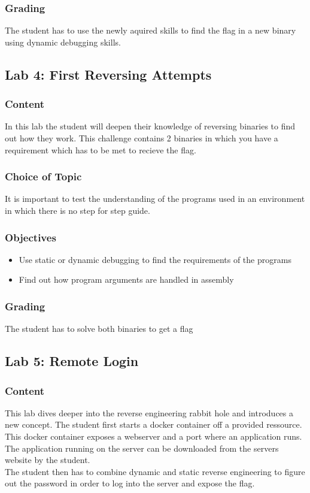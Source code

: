 \subsubsection*{Grading}
The student has to use the newly aquired skills to find the flag in a new binary using dynamic debugging skills.


\subsection{Lab 4: First Reversing Attempts}
\subsubsection*{Content}
In this lab the student will deepen their knowledge of reversing binaries to find out how they work. This challenge contains 2 binaries in which you have a requirement which has to be met to recieve the flag.
\subsubsection*{Choice of Topic}
It is important to test the understanding of the programs used in an environment in which there is no step for step guide.
\subsubsection*{Objectives}
\begin{itemize}
    \item Use static or dynamic debugging to find the requirements of the programs
    \item Find out how program arguments are handled in assembly
\end{itemize}
\subsubsection*{Grading}
The student has to solve both binaries to get a flag


\subsection{Lab 5: Remote Login}
\subsubsection*{Content}
This lab dives deeper into the reverse engineering rabbit hole and introduces a new concept. The student first starts a docker container off a provided ressource.
This docker container exposes a webserver and a port where an application runs. The application running on the server can be downloaded from the servers website by the student. \\
The student then has to combine dynamic and static reverse engineering to figure out the password in order to log into the server and expose the flag.

